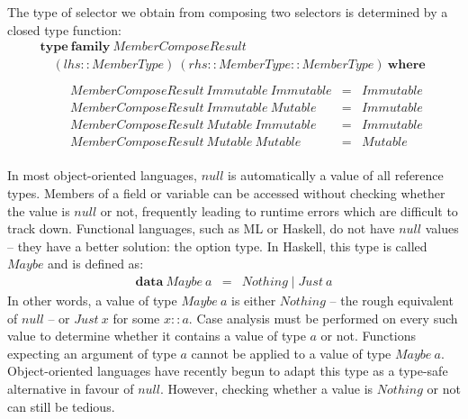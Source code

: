 The type of selector we obtain from composing two selectors is determined by a closed type function:
\begin{displaymath}
\begin{array}{l}
\mathbf{type}~\mathbf{family}~\mathit{MemberComposeResult} \\
\quad (\mathit{lhs} :: \mathit{MemberType})~(\mathit{rhs} :: \mathit{MemberType} :: \mathit{MemberType})~\mathbf{where} \\\\
\qquad \begin{array}{lcl}
\mathit{MemberComposeResult}~\mathit{Immutable}~\mathit{Immutable} & = & \mathit{Immutable} \\
\mathit{MemberComposeResult}~\mathit{Immutable}~\mathit{Mutable} & = & \mathit{Immutable} \\
\mathit{MemberComposeResult}~\mathit{Mutable}~\mathit{Immutable} & = & \mathit{Immutable} \\
\mathit{MemberComposeResult}~\mathit{Mutable}~\mathit{Mutable} & = & \mathit{Mutable} 
\end{array}
\end{array}
\end{displaymath}

In most object-oriented languages, $\mathit{null}$ is automatically a value of all reference types. Members of a field or variable can be accessed without checking whether the value is $\mathit{null}$ or not, frequently leading to runtime errors which are difficult to track down. Functional languages, such as ML or Haskell, do not have $\mathit{null}$ values -- they have a better solution: the option type. In Haskell, this type is called $\mathit{Maybe}$ and is defined as:
\begin{displaymath}
\begin{array}{lcl}
\mathbf{data}~\mathit{Maybe}~a & = & \mathit{Nothing} \mid \mathit{Just}~a
\end{array}
\end{displaymath}
In other words, a value of type $\mathit{Maybe}~a$ is either $\mathit{Nothing}$ -- the rough equivalent of $\mathit{null}$ -- or $\mathit{Just}~x$ for some $x :: a$. Case analysis must be performed on every such value to determine whether it contains a value of type $a$ or not. Functions expecting an argument of type $a$ cannot be applied to a value of type $\mathit{Maybe}~a$. Object-oriented languages have recently begun to adapt this type as a type-safe alternative in favour of $\mathit{null}$. However, checking whether a value is $\mathit{Nothing}$ or not can still be tedious. 

